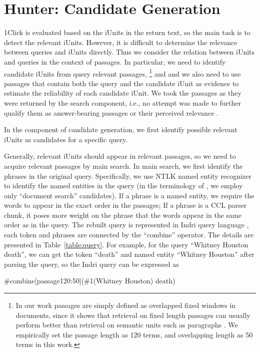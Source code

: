 \section{Hunter: Candidate Generation}
1Click is evaluated based on the iUnits in the return text, so the
main task is to detect the relevant iUnits. However, it is difficult
to determine the relevance between queries and iUnits directly. Thus
we consider the relation between iUnits and queries in the context
of passages. In particular, we need to identify candidate iUnits
from query relevant passages, \footnote{In our work passages are
simply defined as overlapped fixed windows in documents, since it
shows that retrieval on fixed length passages can usually perform
better than retrieval on semantic units such as paragraphs
\cite{Callan_SIGIR94,Zobel_etal_IPM95}. We empirically set the
passage length as 120 terms, and overlapping length as 50 terms in
this work.} and and we also need to use passages that contain both
the query and the candidate iUnit as evidence to estimate the
reliability of each candidate iUnit. We took the passages as they
were returned by the search component, i.e., no attempt was made to
further qualify them as answer-bearing passages
\cite{conf/cikm/KrikonCK12} or their perceived relevance
\cite{he-duboue-nie:2012:PAPERS}.

In the component of candidate generation, we first identify possible relevant iUnits as candidates for a specific query.

Generally, relevant iUnits should appear in relevant passages, so we need to acquire relevant passages by main search.
In main search, we first identify the phrases in the original query.
Specifically, we use NTLK named entity recognizer to identify the named entities in the query (in the terminology of \cite{conf/aaai/Chu-CarrollF11}, we employ only ``document search'' candidates).
If a phrase is a named entity, we require the words to appear in the exact order in the passages;
If a phrase is a CCL parser chunk, it poses more weight on the phrase that the words appear in the same order as in the query.
The rebuilt query is represented in Indri query language \cite{strohman_ICIA2005}, each token and phrases are connected by the ``combine'' operator.
The details are presented in Table~\ref{table:query}.
For example, for the query ``Whitney Houston death'', we can get the token ``death'' and named entity ``Whitney Houston'' after parsing the query, so the Indri query can be expressed as

\begin{center}
\#combine[passage120:50](\#1(Whitney Houston) death)
\end{center}


